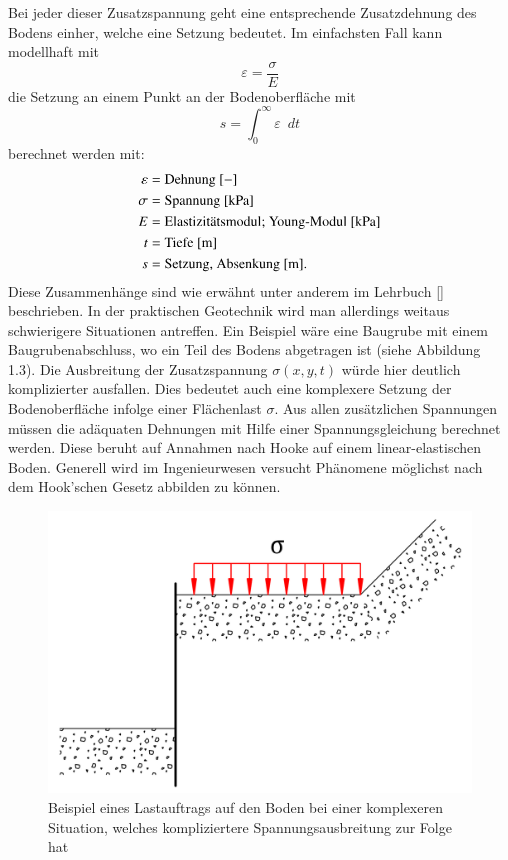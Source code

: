 Bei jeder dieser Zusatzspannung geht eine entsprechende Zusatzdehnung des Bodens einher, welche eine Setzung bedeutet.
Im einfachsten Fall kann modellhaft mit
\[
\varepsilon
=
\frac{\sigma}{E}
\]
die Setzung an einem Punkt an der Bodenoberfläche mit
\[
s
=
\int_{0}^{\infty}\varepsilon\enspace dt
\]
berechnet werden mit:
\begin{align*}
	\varepsilon &= \text{Dehnung [$-$]}                                     \\
	     \sigma &= \text{Spannung [\si{\kilo\pascal}]}                      \\
	          E &= \text{Elastizitätsmodul; Young-Modul [\si{\kilo\pascal}]}\\
	          t &= \text{Tiefe [\si{\meter}]}                               \\
	          s &= \text{Setzung, Absenkung [m].}
\end{align*}
Diese Zusammenhänge sind wie erwähnt unter anderem im  Lehrbuch [\cite{spannung:Grundlagen der Geotechnik}] beschrieben.
In der praktischen Geotechnik wird man allerdings weitaus schwierigere Situationen antreffen.
Ein Beispiel wäre eine Baugrube mit einem Baugrubenabschluss, wo ein Teil des Bodens abgetragen ist (siehe Abbildung 1.3).
Die Ausbreitung der Zusatzspannung $\sigma(x,y,t)$ würde hier deutlich komplizierter ausfallen.
Dies bedeutet auch eine komplexere Setzung der Bodenoberfläche infolge einer Flächenlast $\sigma$.
Aus allen zusätzlichen Spannungen müssen die adäquaten Dehnungen mit Hilfe einer Spannungsgleichung berechnet werden.
Diese beruht auf Annahmen nach Hooke auf einem linear-elastischen Boden.
Generell wird im Ingenieurwesen versucht Phänomene möglichst nach dem Hook'schen Gesetz abbilden zu können.

\begin{figure}
	\centering
	\includegraphics[width=0.45\linewidth,keepaspectratio]{papers/spannung/Grafiken/Bild3.png}
	\caption{Beispiel eines Lastauftrags auf den Boden bei einer komplexeren Situation, welches kompliziertere Spannungsausbreitung zur Folge hat}
	\label{fig:Bild3}
\end{figure}